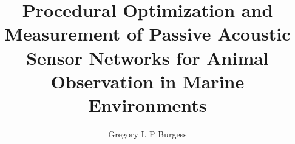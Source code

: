 \documentclass[11pt]{uhthesis}
\title{Procedural Optimization and Measurement of Passive Acoustic Sensor Networks for Animal Observation in Marine Environments}
\author{Gregory L P Burgess}
\begin{document}
\maketitle

\begin{frontmatter}


\copyrightpage







\tableofcontents

\listoftables

\listoffigures

\end{frontmatter}







\appendix



\nocite{*}



%
\end{document}
